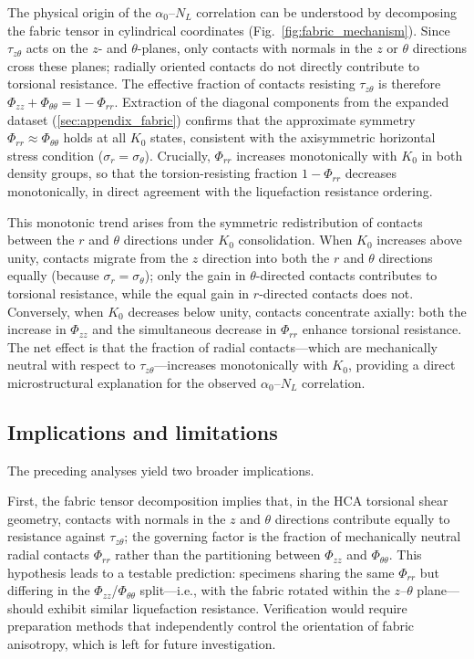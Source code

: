 \documentclass[a4paper,fleqn]{cas-sc}
\newcommand{\Kzero}{\ensuremath{K_0}}
\begin{document}
The physical origin of the $\alpha_0$--$N_L$ correlation can be understood by decomposing the fabric tensor in cylindrical coordinates (Fig.~\ref{fig:fabric_mechanism}). Since $\tau_{z\theta}$ acts on the $z$- and $\theta$-planes, only contacts with normals in the $z$ or $\theta$ directions cross these planes; radially oriented contacts do not directly contribute to torsional resistance. The effective fraction of contacts resisting $\tau_{z\theta}$ is therefore $\Phi_{zz} + \Phi_{\theta\theta} = 1 - \Phi_{rr}$. Extraction of the diagonal components from the expanded dataset (\cref{sec:appendix_fabric}) confirms that the approximate symmetry $\Phi_{rr} \approx \Phi_{\theta\theta}$ holds at all \Kzero{} states, consistent with the axisymmetric horizontal stress condition ($\sigma_r = \sigma_\theta$). Crucially, $\Phi_{rr}$ increases monotonically with \Kzero{} in both density groups, so that the torsion-resisting fraction $1 - \Phi_{rr}$ decreases monotonically, in direct agreement with the liquefaction resistance ordering.

This monotonic trend arises from the symmetric redistribution of contacts between the $r$ and $\theta$ directions under \Kzero{} consolidation. When \Kzero{} increases above unity, contacts migrate from the $z$ direction into both the $r$ and $\theta$ directions equally (because $\sigma_r = \sigma_\theta$); only the gain in $\theta$-directed contacts contributes to torsional resistance, while the equal gain in $r$-directed contacts does not. Conversely, when \Kzero{} decreases below unity, contacts concentrate axially: both the increase in $\Phi_{zz}$ and the simultaneous decrease in $\Phi_{rr}$ enhance torsional resistance. The net effect is that the fraction of radial contacts---which are mechanically neutral with respect to $\tau_{z\theta}$---increases monotonically with \Kzero{}, providing a direct microstructural explanation for the observed $\alpha_0$--$N_L$ correlation.

\subsection{Implications and limitations}
\label{subsec:limitations}

The preceding analyses yield two broader implications.

First, the fabric tensor decomposition implies that, in the HCA torsional shear geometry, contacts with normals in the $z$ and $\theta$ directions contribute equally to resistance against $\tau_{z\theta}$; the governing factor is the fraction of mechanically neutral radial contacts $\Phi_{rr}$ rather than the partitioning between $\Phi_{zz}$ and $\Phi_{\theta\theta}$. This hypothesis leads to a testable prediction: specimens sharing the same $\Phi_{rr}$ but differing in the $\Phi_{zz}$/$\Phi_{\theta\theta}$ split---i.e., with the fabric rotated within the $z$--$\theta$ plane---should exhibit similar liquefaction resistance. Verification would require preparation methods that independently control the orientation of fabric anisotropy, which is left for future investigation.
\end{document}
